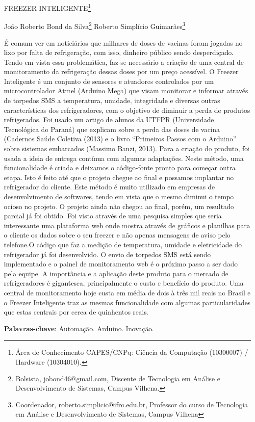\documentclass[article,12pt,onesidea,4paper,english,brazil]{abntex2}
\begin{document}
	
	
	\frenchspacing 
	
	\begin{center}
		\LARGE FREEZER INTELIGENTE\footnote{Área de Conhecimento CAPES/CNPq: Ciência da Computação (10300007) / Hardware (10304010).}
		
		\normalsize
		João Roberto Bond da Silva\footnote{Bolsista, jobond46@gmail.com, Discente de Tecnologia em Análise e Desenvolvimento de Sistemas, Campus Vilhena.} 
		Roberto Simplício Guimarães\footnote{Coordenador, roberto.simplicio@ifro.edu.br, Professor do curso de Tecnologia em Análise e Desenvolvimento de Sistemas, Campus Vilhena}
	\end{center}
	
	\noindent É comum ver em noticiários que milhares de doses de vacinas foram jogadas no lixo
	por falta de refrigeração, com isso, dinheiro público sendo desperdiçado. Tendo em
	vista essa problemática, faz-se necessário a criação de uma central de
	monitoramento da refrigeração dessas doses por um preço acessível. O Freezer
	Inteligente é um conjunto de sensores e atuadores controlados por um
	microcontrolador Atmel (Arduino Mega) que visam monitorar e informar através de
	torpedos SMS a temperatura, umidade, integridade e diversas outras características
	dos refrigeradores, com o objetivo de diminuir a perda de produtos refrigerados. Foi
	usado um artigo de alunos da UTFPR (Universidade Tecnológica do Paraná) que
	explicam sobre a perda das doses de vacina (Cadernos Saúde Coletiva (2013) e o
	livro “Primeiros Passos com o Arduino” sobre sistemas embarcados (Massimo Banzi,
	2013). Para a criação do produto, foi usada a ideia de entrega contínua com
	algumas adaptações. Neste método, uma funcionalidade é criada e deixamos o
	código-fonte pronto para começar outra etapa. Isto é feito até que o projeto chegue
	ao final e possamos implantar no refrigerador do cliente. Este método é muito
	utilizado em empresas de desenvolvimento de softwares, tendo em vista que o
	mesmo diminui o tempo ocioso no projeto. O projeto ainda não chegou ao final,
	porém, um resultado parcial já foi obtido. Foi visto através de uma pesquisa simples
	que seria interessante uma plataforma web onde mostra através de gráficos e
	planilhas para o cliente os dados sobre o seu freezer e não apenas mensagens de
	aviso pelo telefone.O código que faz a medição de temperatura, umidade e
	eletricidade do refrigerador já foi desenvolvido. O envio de torpedos SMS está sendo
	implementado e o painel de monitoramento web é o próximo passo a ser dado pela
	equipe. A importância e a aplicação deste produto para o mercado de refrigeradores
	é gigantesca, principalmente o custo e benefício do produto. Uma central de
	monitoramento hoje custa em média de dois à três mil reais no Brasil e o Freezer
	Inteligente traz as mesmas funcionalidade com algumas particularidades que estas
	centrais por cerca de quinhentos reais.
	
	\vspace{\onelineskip}
	
	\noindent
	\textbf{Palavras-chave}: Automação. Arduino. Inovação.
	
\end{document}
